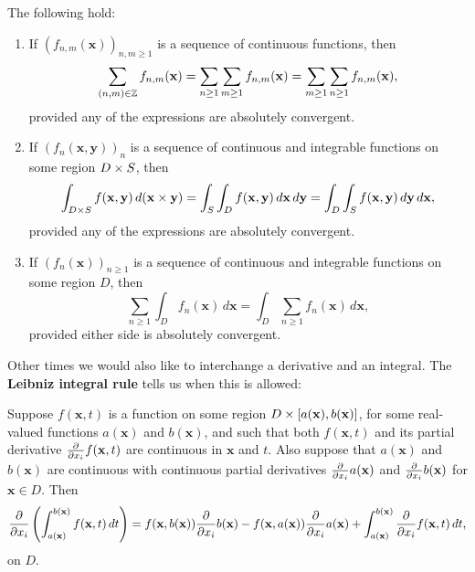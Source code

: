     \begin{theorem}
      The following hold:
      \begin{enumerate}[label=(\roman*)]
        \item If $(f_{n,m}(\mathbf{x}))_{n,m \ge 1}$ is a sequence of continuous functions, then
        \[
          \sum_{(n,m) \in \mathbb{Z}}f_{n,m}(\mathbf{x}) = \sum_{n \ge 1}\sum_{m \ge 1}f_{n,m}(\mathbf{x}) = \sum_{m \ge 1}\sum_{n \ge 1}f_{n,m}(\mathbf{x}),
        \]
        provided any of the expressions are absolutely convergent.
        \item If $(f_{n}(\mathbf{x},\mathbf{y}))_{n}$ is a sequence of continuous and integrable functions on some region $D \times S$, then
        \[
          \int_{D \times S}f(\mathbf{x},\mathbf{y})\,d(\mathbf{x} \times \mathbf{y}) = \int_{S}\int_{D}f(\mathbf{x},\mathbf{y})\,d\mathbf{x}\,d\mathbf{y} = \int_{D}\int_{S}f(\mathbf{x},\mathbf{y})\,d\mathbf{y}\,d\mathbf{x},
        \]
        provided any of the expressions are absolutely convergent.
        \item If $(f_{n}(\mathbf{x}))_{n \ge 1}$ is a sequence of continuous and integrable functions on some region $D$, then
        \[
         \sum_{n \ge 1}\int_{D}f_{n}(\mathbf{x})\,d\mathbf{x} = \int_{D}\sum_{n \ge 1}f_{n}(\mathbf{x})\,d\mathbf{x},
        \]
        provided either side is absolutely convergent.
      \end{enumerate}
    \end{theorem}

    Other times we would also like to interchange a derivative and an integral. The \textbf{Leibniz integral rule} tells us when this is allowed:

    \begin{theorem}
      Suppose $f(\mathbf{x},t)$ is a function on some region $D \times [a(\mathbf{x}),b(\mathbf{x})]$, for some real-valued functions $a(\mathbf{x})$ and $b(\mathbf{x})$, and such that both $f(\mathbf{x},t)$ and its partial derivative $\frac{\partial}{\partial x_{i}}f(\mathbf{x},t)$ are continuous in $\mathbf{x}$ and $t$. Also suppose that $a(\mathbf{x})$ and $b(\mathbf{x})$ are continuous with continuous partial derivatives $\frac{\partial}{\partial x_{i}}a(\mathbf{x})$ and $\frac{\partial}{\partial x_{i}}b(\mathbf{x})$ for $\mathbf{x} \in D$. Then
      \[
        \frac{\partial}{\partial x_{i}}\left(\int_{a(\mathbf{x})}^{b(\mathbf{x})}f(\mathbf{x},t)\,dt\right) = f(\mathbf{x},b(\mathbf{x}))\frac{\partial}{\partial x_{i}}b(\mathbf{x})-f(\mathbf{x},a(\mathbf{x}))\frac{\partial}{\partial x_{i}}a(\mathbf{x})+\int_{a(\mathbf{x})}^{b(\mathbf{x})}\frac{\partial}{\partial x_{i}}f(\mathbf{x},t)\,dt,
      \]
      on $D$.
    \end{theorem}
    
